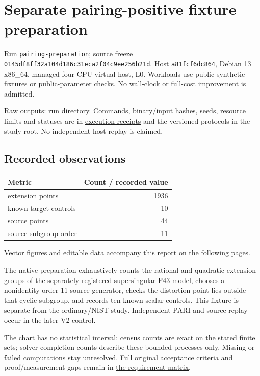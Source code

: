 \documentclass[
  10pt,
  letterpaper,
  landscape]{article}
\author{}
\date{}
\begin{document}
\section{Separate pairing-positive fixture
preparation}\label{separate-pairing-positive-fixture-preparation}

Run \texttt{pairing-preparation}; source freeze
\texttt{0145df8ff32a104d186c31eca2f04c9ee256b21d}. Host
\texttt{a81fcf6dc864}, Debian 13 x86\_64, managed four-CPU virtual host,
L0. Workloads use public synthetic fixtures or public-parameter checks.
No wall-clock or full-cost improvement is admitted.

Raw outputs: \href{../../../execution-v1/pairing-fixture/}{run
directory}. Commands, binary/input hashes, seeds, resource limits and
statuses are in \href{../../../execution-v1/}{execution receipts} and
the versioned protocols in the study root. No independent-host replay is
claimed.

\subsection{Recorded observations}\label{recorded-observations}

\begin{longtable}[]{@{}lr@{}}
\toprule\noalign{}
Metric & Count / recorded value \\
\midrule\noalign{}
\endhead
\bottomrule\noalign{}
\endlastfoot
extension points & 1936 \\
known target controls & 10 \\
source points & 44 \\
source subgroup order & 11 \\
\end{longtable}

Vector figures and editable data accompany this report on the following pages.

The native preparation exhaustively counts the rational and
quadratic-extension groups of the separately registered supersingular
F43 model, chooses a nonidentity order-11 source generator, checks the
distortion point lies outside that cyclic subgroup, and records ten
known-scalar controls. This fixture is separate from the ordinary/NIST
study. Independent PARI and source replay occur in the later V2 control.

The chart has no statistical interval: census counts are exact on the
stated finite sets; solver completion counts describe these bounded
processes only. Missing or failed computations stay unresolved. Full
original acceptance criteria and proof/measurement gaps remain in
\href{../../../EXPERIMENTS.md}{the requirement matrix}.
\end{document}

